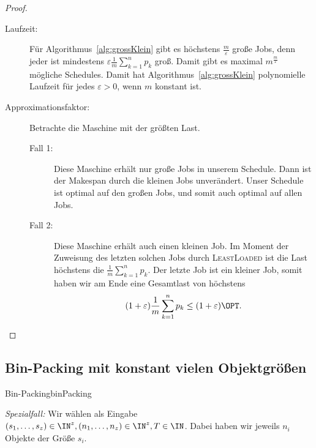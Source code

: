 \documentclass[language=ngerman,algolist]{TemplateLecture}
\begin{document}
\begin{proof}
    \begin{description}
        \item[Laufzeit:] Für Algorithmus~\ref{alg:grossKlein} gibt es höchstens $\frac{m}{\varepsilon}$ große Jobs, denn jeder ist mindestens $\varepsilon\frac{1}{m}\sum_{k=1}^n p_k$ groß. Damit gibt es maximal $m^{\frac{m}{\varepsilon}}$ mögliche Schedules. Damit hat Algorithmus~\ref{alg:grossKlein} polynomielle Laufzeit für jedes $\varepsilon > 0$, wenn $m$ konstant ist.
        \item[Approximationsfaktor:] Betrachte die Maschine mit der größten Last.
        \begin{description}
            \item[Fall 1:] Diese Maschine erhält nur große Jobs in unserem Schedule. Dann ist der Makespan durch die kleinen Jobs unverändert. Unser Schedule ist optimal auf den großen Jobs, und somit auch optimal auf allen Jobs.
            \item[Fall 2:] Diese Maschine erhält auch einen kleinen Job. Im Moment der Zuweisung des letzten solchen Jobs durch \textsc{LeastLoaded} ist die Last höchstens die $\frac{1}{m}\sum_{k=1}^n p_k$. Der letzte Job ist ein kleiner Job, somit haben wir am Ende eine Gesamtlast von höchstens 
            \begin{equation*}
                (1+\varepsilon)\frac{1}{m}\sum_{k=1}^n p_k \leq (1+\varepsilon)\OPT.
            \end{equation*}
        \end{description}
    \end{description}
\end{proof}

\subsection{Bin-Packing mit konstant vielen Objektgrößen}

\begin{prob}{Bin-Packing}{binPacking}
\end{prob}

\emph{Spezialfall:} Wir wählen als Eingabe $(s_1, \ldots, s_z) \in \IN^z, (n_1, \ldots, n_z) \in \IN^z, T \in \IN$. Dabei haben wir jeweils $n_i$ Objekte der Größe $s_i$.
\end{document}
